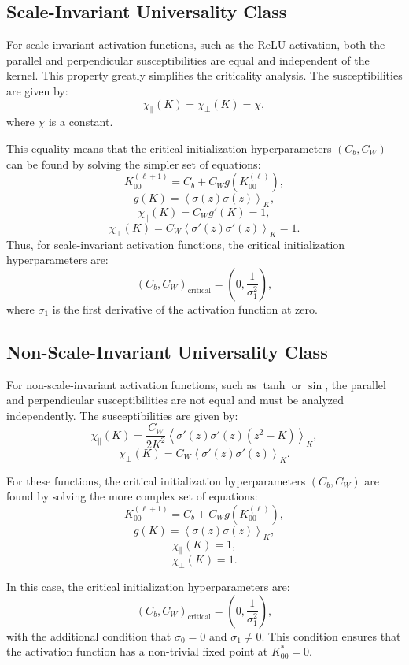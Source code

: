 \documentclass{article}
\begin{document}
\subsection*{Scale-Invariant Universality Class}

For scale-invariant activation functions, such as the ReLU activation, both the parallel and perpendicular susceptibilities are equal and independent of the kernel. This property greatly simplifies the criticality analysis. The susceptibilities are given by:
\[
\chi_{\parallel}(K) = \chi_{\perp}(K) = \chi,
\]
where $\chi$ is a constant.

This equality means that the critical initialization hyperparameters $(C_b, C_W)$ can be found by solving the simpler set of equations:
\[
K_{00}^{(\ell+1)} = C_b + C_W g(K_{00}^{(\ell)}),
\]
\[
g(K) = \left\langle \sigma(z)\sigma(z) \right\rangle_K,
\]
\[
\chi_{\parallel}(K) = C_W g'(K) = 1,
\]
\[
\chi_{\perp}(K) = C_W \left\langle \sigma'(z) \sigma'(z) \right\rangle_K = 1.
\]
Thus, for scale-invariant activation functions, the critical initialization hyperparameters are:
\[
(C_b, C_W)_{\text{critical}} = \left(0, \frac{1}{\sigma_1^2}\right),
\]
where $\sigma_1$ is the first derivative of the activation function at zero.

\subsection*{Non-Scale-Invariant Universality Class}

For non-scale-invariant activation functions, such as $\tanh$ or $\sin$, the parallel and perpendicular susceptibilities are not equal and must be analyzed independently. The susceptibilities are given by:
\[
\chi_{\parallel}(K) = \frac{C_W}{2K^2} \left\langle \sigma'(z)\sigma'(z)(z^2 - K) \right\rangle_K,
\]
\[
\chi_{\perp}(K) = C_W \left\langle \sigma'(z) \sigma'(z) \right\rangle_K.
\]

For these functions, the critical initialization hyperparameters $(C_b, C_W)$ are found by solving the more complex set of equations:
\[
K_{00}^{(\ell+1)} = C_b + C_W g(K_{00}^{(\ell)}),
\]
\[
g(K) = \left\langle \sigma(z)\sigma(z) \right\rangle_K,
\]
\[
\chi_{\parallel}(K) = 1,
\]
\[
\chi_{\perp}(K) = 1.
\]

In this case, the critical initialization hyperparameters are:
\[
(C_b, C_W)_{\text{critical}} = \left(0, \frac{1}{\sigma_1^2}\right),
\]
with the additional condition that $\sigma_0 = 0$ and $\sigma_1 \neq 0$. This condition ensures that the activation function has a non-trivial fixed point at $K^*_{00} = 0$.
\end{document}
